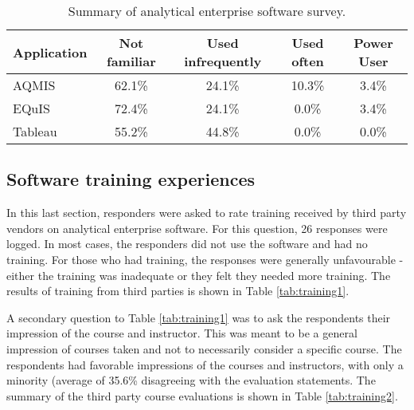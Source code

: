 \begin{table}[!htpb]
\centering
\caption{Summary of analytical enterprise software survey.}
\label{tab:enterprisesumm}
\begin{tabular}{@{}lcccc@{}}
\toprule
\textbf{Application} & \textbf{Not familiar} & \textbf{Used infrequently} & \textbf{Used often} & \textbf{Power User} \\ \midrule
AQMIS & 62.1\% & 24.1\% & 10.3\% & 3.4\% \\
EQuIS & 72.4\% & 24.1\% & 0.0\% & 3.4\% \\
Tableau & 55.2\% & 44.8\% & 0.0\% & 0.0\% \\ \bottomrule
\end{tabular}
\end{table}

\subsection{Software training experiences}
In this last section, responders were asked to rate training received by third party vendors on analytical enterprise software. For this question, 26 responses were logged. In most cases, the responders did not use the software and had no training. For those who had training, the responses were generally unfavourable - either the training was inadequate or they felt they needed more training. The results of training from third parties is shown in Table \ref{tab:training1}.

\begin{table}[!htpb]
\centering
\caption{Results of training from third parties on analytical enterprise software.}
\label{tab:training1}
\end{table}

A secondary question to Table \ref{tab:training1} was to ask the respondents their impression of the course and instructor. This was meant to be a general impression of courses taken and not to necessarily consider a specific course. The respondents had favorable impressions of the courses and instructors, with only a minority (average of 35.6\% disagreeing with the evaluation statements. The summary of the third party course evaluations is shown in Table \ref{tab:training2}.

